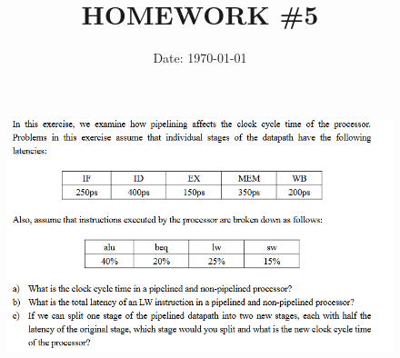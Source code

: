 \documentclass[cn,12pt]{homework}
\title{HOMEWORK \#5} %
\date{Date: \today} %
\institute{ZHEJIANG UNIVERSITY\quad COLLEGE OF INFORMATION SCIENCE AND ELECTRONICS ENGINEERING} %
\begin{document}
\maketitle



\begin{problem}
\begin{figure}[h!]
  \centering
  \includegraphics[width=1\textwidth]{./figures/image1.png}
  \label{fig:pro1}
\end{figure}

\end{problem}
\end{document}
